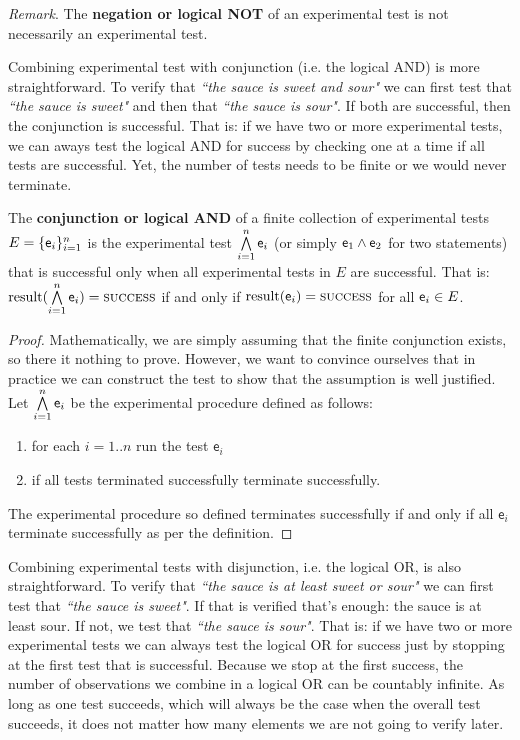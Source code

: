 \documentclass[11pt,letterpaper,fleqn]{memoir} %
\begin{document}
\begin{mathSection}
	\emph{Remark}. The \textbf{negation or logical NOT} of an experimental test is not necessarily an experimental test.
\end{mathSection}

Combining experimental test with conjunction (i.e. the logical AND) is more straightforward. To verify that \emph{``the sauce is sweet and sour"} we can first test that \emph{``the sauce is sweet"} and then that \emph{``the sauce is sour"}. If both are successful, then the conjunction is successful. That is: if we have two or more experimental tests, we can aways test the logical AND for success by checking one at a time if all tests are successful. Yet, the number of tests needs to be finite or we would never terminate.

\begin{mathSection}
	\begin{defn}
	The \textbf{conjunction or logical AND} of a finite collection of experimental tests $E=\{\mathsf{e}_i\}_{i=1}^{n}$ is the experimental test $\bigwedge\limits_{i=1}^{n} \mathsf{e}_i$ (or simply $\mathsf{e}_1 \wedge \mathsf{e}_2$ for two statements) that is successful only when all experimental tests in $E$ are successful. That is: $\operatorname{result}(\bigwedge\limits_{i=1}^{n} \mathsf{e}_i) = \textsc{success}$ if and only if $\operatorname{result}(\mathsf{e}_i) = \textsc{success}$ for all $\mathsf{e}_i \in E$.
	\end{defn}
	\begin{proof}
		Mathematically, we are simply assuming that the finite conjunction exists, so there it nothing to prove. However, we want to convince ourselves that in practice we can construct the test to show that the assumption is well justified. Let $\bigwedge\limits_{i=1}^{n} \mathsf{e}_i$ be the experimental procedure defined as follows:
		\begin{enumerate}
			\item for each $i=1..n$ run the test $\mathsf{e}_i$
			\item if all tests terminated successfully terminate successfully.
		\end{enumerate}
		The experimental procedure so defined terminates successfully if and only if all $\mathsf{e}_i$ terminate successfully as per the definition.
	\end{proof}
\end{mathSection}	

Combining experimental tests with disjunction, i.e. the logical OR, is also straightforward. To verify that \emph{``the sauce is at least sweet or sour"} we can first test that \emph{``the sauce is sweet"}. If that is verified that's enough: the sauce is at least sour. If not, we test that \emph{``the sauce is sour"}. That is: if we have two or more experimental tests we can always test the logical OR for success just by stopping at the first test that is successful. Because we stop at the first success, the number of observations we combine in a logical OR can be countably infinite. As long as one test succeeds, which will always be the case when the overall test succeeds, it does not matter how many elements we are not going to verify later.
\end{document}
